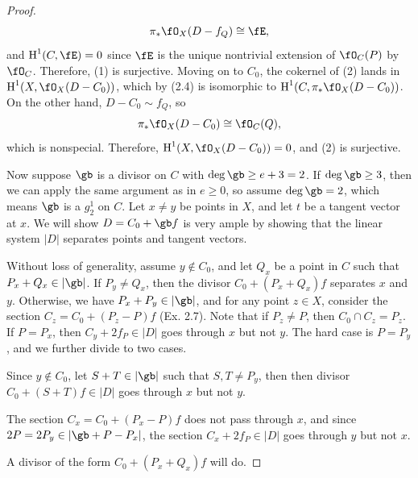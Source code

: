 \documentclass[a4paper]{article}
\begin{document}
\begin{enumerate} [label=\textbf{\arabic*.}, leftmargin=0em]
\begin{proof}
\begin{equation*}
                  \pi_*\fO_X(D - f_Q) \cong \fE,
              \end{equation*}
              and $\cH^1(C, \fE) = 0$ since $\fE$ is the unique nontrivial extension of $\fO_C(P)$ by $\fO_C$.
              Therefore, (1) is surjective.
              Moving on to $C_0$, the cokernel of (2) lands in $\cH^1(X, \fO_X(D - C_0))$, which by (2.4) is isomorphic to $\cH^1(C, \pi_*\fO_X(D -C_0))$.
              On the other hand, $D - C_0 \sim f_Q$, so
              \begin{equation*}
                  \pi_*\fO_X(D - C_0) \cong \fO_C(Q),
              \end{equation*}
              which is nonspecial.
              Therefore, $\cH^1(X, \fO_X(D - C_0)) = 0$, and (2) is surjective.

              Now suppose $\gb$ is a divisor on $C$ with $\deg \gb \geq e + 3 = 2$.
              If $\deg \gb \geq 3$, then we can apply the same argument as in $e \geq 0$, so assume $\deg \gb = 2$, which means $\gb$ is a $g^1_2$ on $C$.
              Let $x \neq y$ be points in $X$, and let $t$ be a tangent vector at $x$.
              We will show $D = C_0 + \gb f$ is very ample by showing that the linear system $|D|$ separates points and tangent vectors.

              Without loss of generality, assume $y \notin C_0$, and let $Q_x$ be a point in $C$ such that $P_x + Q_x \in |\gb|$.
              If $P_y \neq Q_x$, then the divisor $C_0 + (P_x + Q_x)f$ separates $x$ and $y$.
              Otherwise, we have $P_x + P_y \in |\gb|$, and for any point $z \in X$, consider the section $C_z = C_0 + (P_z - P)f$ (Ex. 2.7).
              Note that if $P_z \neq P$, then $C_0 \cap C_z = P_z$.
              If $P = P_x$, then $C_y + 2 f_P \in |D|$ goes through $x$ but not $y$.
              The hard case is $P = P_y$, and we further divide to two cases.

               Since $y \notin C_0$, let $S + T \in |\gb|$ such that $S, T \neq P_y$, then then divisor $C_0 + (S + T)f \in |D|$ goes through $x$ but not $y$.

               The section $C_x = C_0 + (P_x - P)f$ does not pass through $x$, and since $2P = 2P_y \in |\gb + P - P_x|$, the section $C_x + 2f_{P} \in |D|$ goes through $y$ but not $x$.
              

               A divisor of the form $C_0 + (P_x + Q_x)f$ will do.


\end{proof}
\end{enumerate}
\end{document}
